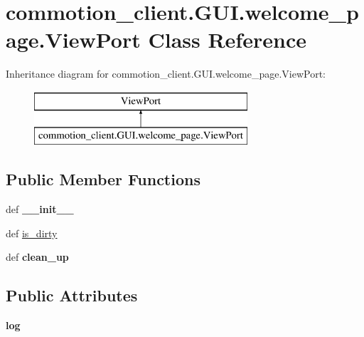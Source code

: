 \hypertarget{classcommotion__client_1_1GUI_1_1welcome__page_1_1ViewPort}{\section{commotion\-\_\-client.\-G\-U\-I.\-welcome\-\_\-page.\-View\-Port Class Reference}
\label{classcommotion__client_1_1GUI_1_1welcome__page_1_1ViewPort}
}
Inheritance diagram for commotion\-\_\-client.\-G\-U\-I.\-welcome\-\_\-page.\-View\-Port\-:\begin{figure}[H]
\begin{center}
\leavevmode
\includegraphics[height=2.000000cm]{classcommotion__client_1_1GUI_1_1welcome__page_1_1ViewPort}
\end{center}
\end{figure}
\subsection*{Public Member Functions}
\begin{DoxyCompactItemize}
\item 
\hypertarget{classcommotion__client_1_1GUI_1_1welcome__page_1_1ViewPort_a816986c73314e7e90ba4105352b819da}{def {\bfseries \-\_\-\-\_\-init\-\_\-\-\_\-}}\label{classcommotion__client_1_1GUI_1_1welcome__page_1_1ViewPort_a816986c73314e7e90ba4105352b819da}

\item 
def \hyperlink{classcommotion__client_1_1GUI_1_1welcome__page_1_1ViewPort_a25e5d500c5e3df779864b936db537770}{is\-\_\-dirty}
\item 
\hypertarget{classcommotion__client_1_1GUI_1_1welcome__page_1_1ViewPort_afdf765ba2c6ae45e8ab8a4172166ac9d}{def {\bfseries clean\-\_\-up}}\label{classcommotion__client_1_1GUI_1_1welcome__page_1_1ViewPort_afdf765ba2c6ae45e8ab8a4172166ac9d}

\end{DoxyCompactItemize}
\subsection*{Public Attributes}
\begin{DoxyCompactItemize}
\item 
\hypertarget{classcommotion__client_1_1GUI_1_1welcome__page_1_1ViewPort_a007c98fbf258770a2e12594c9c083765}{{\bfseries log}}\label{classcommotion__client_1_1GUI_1_1welcome__page_1_1ViewPort_a007c98fbf258770a2e12594c9c083765}

\end{DoxyCompactItemize}
